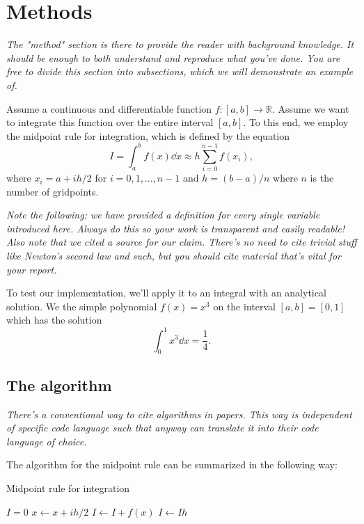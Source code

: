 \documentclass[english,notitlepage, reprint]{revtex4-1}  %
\begin{document}
\section{Methods}
\textit{The "method" section is there to provide the reader with background knowledge. It should be enough to both understand and reproduce what you've done. You are free to divide this section into subsections, which we will demonstrate an example of.}

Assume a continuous and differentiable function $f : [a,b] \to \mathbb{R}$. Assume we want to integrate this function over the entire interval $[a,b]$. To this end, we employ the midpoint rule for integration, which is defined by the equation \cite{midpoint_rule}
\begin{equation}
	I = \int_a^b f(x)\dd x \approx h\sum_{i=0}^{n-1} f(x_i), 
\end{equation}
where $x_i = a + ih/2$ for $i = 0, 1, ..., n-1$ and $h = (b-a)/n$ where $n$ is the number of gridpoints.

\textit{Note the following: we have provided a definition for every single variable introduced here. Always do this so your work is transparent and easily readable! Also note that we cited a source for our claim. There's no need to cite trivial stuff like Newton's second law and such, but you should cite material that's vital for your report.}

To test our implementation, we'll apply it to an integral with an analytical solution. We the simple polynomial $f(x) = x^3$ on the interval $[a,b] = [0,1]$ which has the solution 
\begin{equation}
	\int_0^1 x^3 \dd x = \frac{1}{4}.
\end{equation}

\subsection*{The algorithm}
\textit{There's a conventional way to cite algorithms in papers. This way is independent of specific code language such that anyway can translate it into their code language of choice.}

The algorithm for the midpoint rule can be summarized in the following way:

\begin{algorithm}[H]
	\caption{Midpoint rule for integration}\label{algo:midpoint_rule}
	\begin{algorithmic}
		\State $I = 0$ 
		\State $x \leftarrow x + ih/2$   %
		\State $I \leftarrow I + f(x)$  %
		\EndFor
		\State $I \leftarrow Ih$ 
	\end{algorithmic}
\end{algorithm}
\end{document}
